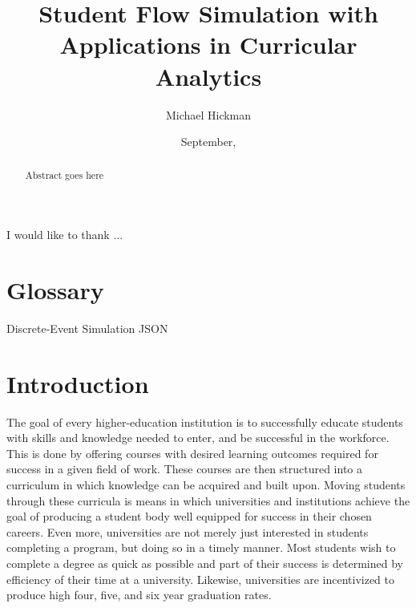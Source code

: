 \documentclass[botnum, fleqn]{unmeethesis}
\begin{document}
\frontmatter

\title{Student Flow Simulation with Applications in Curricular Analytics}
\author{Michael Hickman}
\date{September, \thisyear}

\maketitle
\makecopyright




\begin{acknowledgments}
  \vspace{1.1in}
  I would like to thank ...
\end{acknowledgments}


\maketitleabstract

\begin{abstract}
  Abstract goes here
  \clearpage
\end{abstract}


\tableofcontents
\listoffigures


\chapter{Glossary}
Discrete-Event Simulation
JSON
\mainmatter


\chapter{Introduction}
  The goal of every higher-education institution is to successfully educate students with skills and knowledge needed to enter, and be successful in the workforce. This is done by offering courses with desired learning outcomes required for success in a given field of work. These courses are then structured into a curriculum in which knowledge can be acquired and built upon. Moving students through these curricula is means in which universities and institutions achieve the goal of producing a student body well equipped for success in their chosen careers. Even more, universities are not merely just interested in students completing a program, but doing so in a timely manner. Most students wish to complete a degree as quick as possible and part of their success is determined by efficiency of their time at a university. Likewise, universities are incentivized to produce high four, five, and six year graduation rates.
\end{document}
